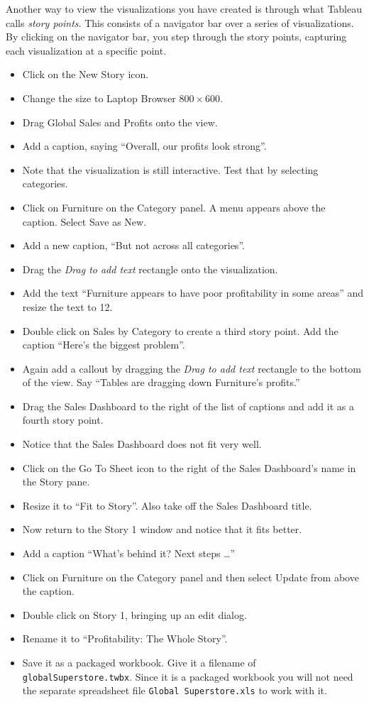 Another way to view the visualizations you have created is through what
Tableau calls \emph{story points}. This consists of a navigator bar over
a series of visualizations. By clicking on the navigator bar, you step
through the story points, capturing each visualization at a specific
point.

\begin{itemize}
\tightlist
\item
  Click on the New Story icon.
\item
  Change the size to Laptop Browser \(800 \times 600\).
\item
  Drag Global Sales and Profits onto the view.
\item
  Add a caption, saying ``Overall, our profits look strong''.
\item
  Note that the visualization is still interactive. Test that by
  selecting categories.
\item
  Click on Furniture on the Category panel. A menu appears above the
  caption. Select Save as New.
\item
  Add a new caption, ``But not across all categories''.
\item
  Drag the \emph{Drag to add text} rectangle onto the visualization.
\item
  Add the text ``Furniture appears to have poor profitability in some
  areas'' and resize the text to 12.
\item
  Double click on Sales by Category to create a third story point. Add
  the caption ``Here's the biggest problem''.
\item
  Again add a callout by dragging the \emph{Drag to add text} rectangle
  to the bottom of the view. Say ``Tables are dragging down Furniture's
  profits.''
\item
  Drag the Sales Dashboard to the right of the list of captions and add
  it as a fourth story point.
\item
  Notice that the Sales Dashboard does not fit very well.
\item
  Click on the Go To Sheet icon to the right of the Sales Dashboard's
  name in the Story pane.
\item
  Resize it to ``Fit to Story''. Also take off the Sales Dashboard
  title.
\item
  Now return to the Story 1 window and notice that it fits better.
\item
  Add a caption ``What's behind it? Next steps \ldots{}''
\item
  Click on Furniture on the Category panel and then select Update from
  above the caption.
\item
  Double click on Story 1, bringing up an edit dialog.
\item
  Rename it to ``Profitability: The Whole Story''.
\item
  Save it as a packaged workbook. Give it a filename of
  \texttt{globalSuperstore.twbx}. Since it is a packaged workbook you
  will not need the separate spreadsheet file
  \texttt{Global\ Superstore.xls} to work with it.
\end{itemize}

